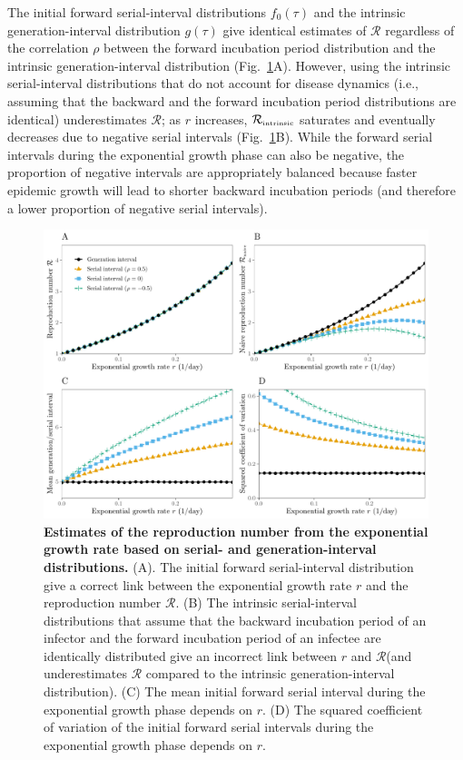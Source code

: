 \documentclass[12pt]{article}
\newcommand{\fref}[1]{Fig.~\ref{fig:#1}}
\newcommand{\RR}{\ensuremath{{\mathcal R}}\xspace}
\newcommand{\Rintrinsic}{\ensuremath{{\mathcal R}_{\textrm{\tiny intrinsic}}}\xspace}
\newcommand{\gdist}{g} %
\begin{document}
The initial forward serial-interval distributions $f_0(\tau)$ and the intrinsic generation-interval distribution $\gdist(\tau)$ give identical estimates of \RR regardless of the correlation $\rho$ between the forward incubation period distribution and the intrinsic generation-interval distribution (\fref{rR}A).
However, using the intrinsic serial-interval distributions that do not account for disease dynamics (i.e., assuming that the backward and the forward incubation period distributions are identical) underestimates \RR;
as $r$ increases, \Rintrinsic saturates and eventually decreases due to negative serial intervals (\fref{rR}B).
While the forward serial intervals during the exponential growth phase can also be negative, the proportion of negative intervals are appropriately balanced because faster epidemic growth will lead to shorter backward incubation periods (and therefore a lower proportion of negative serial intervals).

\begin{figure}[!th]
\includegraphics[width=\textwidth]{rR.pdf}
\caption{
\textbf{Estimates of the reproduction number from the exponential growth rate based on serial- and generation-interval distributions.}
(A). The initial forward serial-interval distribution give a correct link between the exponential growth rate $r$ and the reproduction number \RR.
(B) The intrinsic serial-interval distributions that assume that the backward incubation period of an infector and the forward incubation period of an infectee are identically distributed give an incorrect link between $r$ and \RR (and underestimates \RR compared to the intrinsic generation-interval distribution).
(C) The mean initial forward serial interval during the exponential growth phase depends on $r$.
(D) The squared coefficient of variation of the initial forward serial intervals during the exponential growth phase depends on $r$.
}
\label{fig:rR}
\end{figure}
\end{document}
